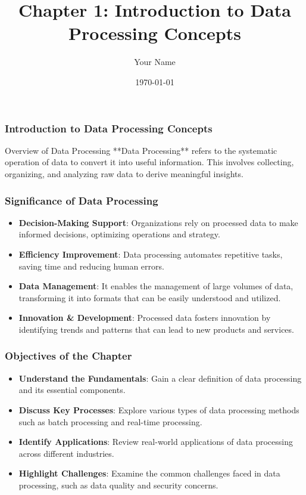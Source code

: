 \documentclass{beamer}
\title{Chapter 1: Introduction to Data Processing Concepts}
\author{Your Name}
\institute{Your Institution}
\date{\today}
\begin{document}
\frame{\titlepage}

\begin{frame}[fragile]
    \frametitle{Introduction to Data Processing Concepts}
    \begin{block}{Overview of Data Processing}
        **Data Processing** refers to the systematic operation of data to convert it into useful information. This involves collecting, organizing, and analyzing raw data to derive meaningful insights.
    \end{block}
\end{frame}

\begin{frame}[fragile]
    \frametitle{Significance of Data Processing}
    \begin{itemize}
        \item \textbf{Decision-Making Support}: Organizations rely on processed data to make informed decisions, optimizing operations and strategy.
        \item \textbf{Efficiency Improvement}: Data processing automates repetitive tasks, saving time and reducing human errors.
        \item \textbf{Data Management}: It enables the management of large volumes of data, transforming it into formats that can be easily understood and utilized.
        \item \textbf{Innovation \& Development}: Processed data fosters innovation by identifying trends and patterns that can lead to new products and services.
    \end{itemize}
\end{frame}

\begin{frame}[fragile]
    \frametitle{Objectives of the Chapter}
    \begin{itemize}
        \item \textbf{Understand the Fundamentals}: Gain a clear definition of data processing and its essential components.
        \item \textbf{Discuss Key Processes}: Explore various types of data processing methods such as batch processing and real-time processing.
        \item \textbf{Identify Applications}: Review real-world applications of data processing across different industries.
        \item \textbf{Highlight Challenges}: Examine the common challenges faced in data processing, such as data quality and security concerns.
    \end{itemize}
\end{frame}
\end{document}
